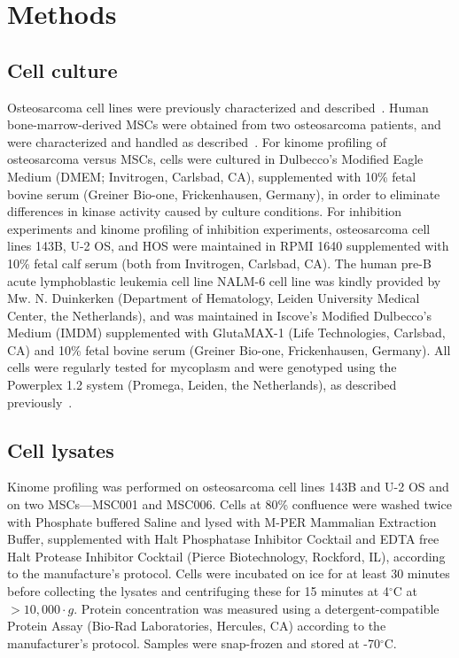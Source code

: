 \section{Methods}\label{methods6}
\subsection{Cell culture}
Osteosarcoma cell lines were previously characterized and described~\cite{ottaviano2010molecular}. Human bone\hyp{}marrow\hyp{}derived MSCs were obtained from two osteosarcoma patients, and were characterized and handled as described~\cite{cleton2009profiling}. For kinome profiling of osteosarcoma versus MSCs, cells were cultured in Dulbecco's Modified Eagle Medium (DMEM; Invitrogen, Carlsbad, CA), supplemented with 10\% fetal bovine serum (Greiner Bio-one, Frickenhausen, Germany), in order to eliminate differences in kinase activity caused by culture conditions. For inhibition experiments and kinome profiling of inhibition experiments, osteosarcoma cell lines 143B, U-2 OS, and HOS were maintained in RPMI 1640 supplemented with 10\% fetal calf serum (both from Invitrogen, Carlsbad, CA). The human pre-B acute lymphoblastic leukemia cell line NALM-6 cell line was kindly provided by Mw. N. Duinkerken (Department of Hematology, Leiden University Medical Center, the Netherlands), and was maintained in Iscove's Modified Dulbecco's Medium (IMDM) supplemented with GlutaMAX-1 (Life Technologies, Carlsbad, CA) and 10\% fetal bovine serum (Greiner Bio-one, Frickenhausen, Germany). All cells were regularly tested for mycoplasm and were genotyped using the Powerplex 1.2 system (Promega, Leiden, the Netherlands), as described previously~\cite{mohseny2011functional}.

\subsection{Cell lysates}
Kinome profiling was performed on osteosarcoma cell lines 143B and U-2 OS and on two MSCs---MSC001 and MSC006. Cells at 80\% confluence were washed twice with Phosphate buffered Saline and lysed with M-PER Mammalian Extraction Buffer, supplemented with Halt Phosphatase Inhibitor Cocktail and EDTA free Halt Protease Inhibitor Cocktail (Pierce Biotechnology, Rockford, IL), according to the manufacture's protocol. Cells were incubated on ice for at least 30 minutes before collecting the lysates and centrifuging these for 15 minutes at 4$^\circ$C at $>10,000\cdot g$. Protein concentration was measured using a detergent\hyp{}compatible Protein Assay (Bio-Rad Laboratories, Hercules, CA) according to the manufacturer's protocol. Samples were snap\hyp{}frozen and stored at -70$^\circ$C.

